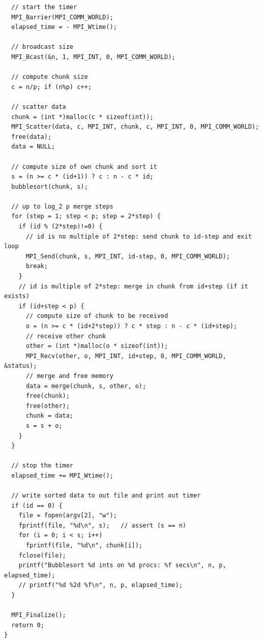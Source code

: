 \documentclass[12pt]{article}
\begin{document}
\begin{lstlisting}
  // start the timer
  MPI_Barrier(MPI_COMM_WORLD);
  elapsed_time = - MPI_Wtime();

  // broadcast size
  MPI_Bcast(&n, 1, MPI_INT, 0, MPI_COMM_WORLD);

  // compute chunk size
  c = n/p; if (n%p) c++;

  // scatter data
  chunk = (int *)malloc(c * sizeof(int));
  MPI_Scatter(data, c, MPI_INT, chunk, c, MPI_INT, 0, MPI_COMM_WORLD);
  free(data);
  data = NULL;

  // compute size of own chunk and sort it
  s = (n >= c * (id+1)) ? c : n - c * id;
  bubblesort(chunk, s);

  // up to log_2 p merge steps
  for (step = 1; step < p; step = 2*step) {
    if (id % (2*step)!=0) {
      // id is no multiple of 2*step: send chunk to id-step and exit loop
      MPI_Send(chunk, s, MPI_INT, id-step, 0, MPI_COMM_WORLD);
      break;
    }
    // id is multiple of 2*step: merge in chunk from id+step (if it exists)
    if (id+step < p) {
      // compute size of chunk to be received
      o = (n >= c * (id+2*step)) ? c * step : n - c * (id+step);
      // receive other chunk
      other = (int *)malloc(o * sizeof(int));
      MPI_Recv(other, o, MPI_INT, id+step, 0, MPI_COMM_WORLD, &status);
      // merge and free memory
      data = merge(chunk, s, other, o);
      free(chunk);
      free(other);
      chunk = data;
      s = s + o;
    }
  }

  // stop the timer
  elapsed_time += MPI_Wtime();

  // write sorted data to out file and print out timer
  if (id == 0) {
    file = fopen(argv[2], "w");
    fprintf(file, "%d\n", s);   // assert (s == n)
    for (i = 0; i < s; i++)
      fprintf(file, "%d\n", chunk[i]);
    fclose(file);
    printf("Bubblesort %d ints on %d procs: %f secs\n", n, p, elapsed_time);
    // printf("%d %2d %f\n", n, p, elapsed_time);
  }

  MPI_Finalize();
  return 0;
} \end{lstlisting}
\end{document}

